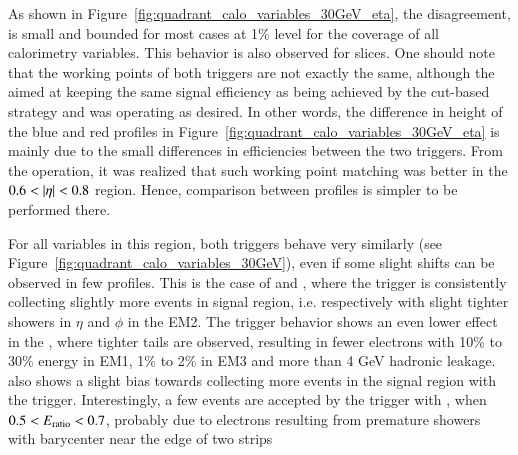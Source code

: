 As shown in Figure~\ref{fig:quadrant_calo_variables_30GeV_eta}, the disagreement, %
is small and bounded for most cases at 1\% level for the coverage of all calorimetry variables. 
This behavior is also observed for \et{} slices. 
One should note that the working points of both triggers are not exactly the same, although the \rnn{} aimed at keeping the same signal efficiency as being achieved by the cut-based strategy and was operating as desired.  
In other words, 
the difference in height of the blue and red profiles in Figure~\ref{fig:quadrant_calo_variables_30GeV_eta} is mainly due to the small differences in efficiencies between the two triggers.
From the operation, it was realized that such working point matching was better in the $0.6<\abseta{}<0.8$ region. Hence, comparison between profiles is simpler to be performed there.

For all variables in this region, both triggers behave very similarly (see Figure~\ref{fig:quadrant_calo_variables_30GeV}), even if some slight shifts can be observed in few profiles. This is the case of \reta{} and \rphi{}, where the \rnn{} trigger is consistently collecting slightly more events in signal region, i.e. respectively with slight tighter showers in $\eta{}$ and $\phi{}$ in the EM2. The \rnn{} trigger behavior shows an even lower effect in the \rhad{}, where tighter tails are observed, resulting in fewer electrons with 10\% to 30\% energy in EM1, 1\% to 2\% in EM3 and more than 4 GeV hadronic leakage. \eratio{} also shows a slight bias towards collecting more events in the signal region with the \rnn{} trigger. Interestingly, a few events are accepted by the trigger with \rnn{}, when $0.5<E_\text{ratio}{}<0.7$, probably due to electrons resulting from premature showers with barycenter near the edge of two strips

